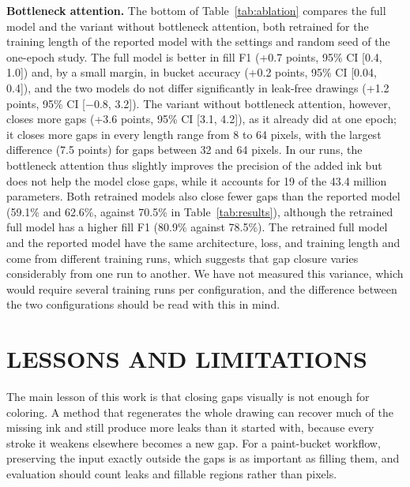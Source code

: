 \documentclass{IEEEcsmag}
\begin{document}
\textbf{Bottleneck attention.} The bottom of Table~\ref{tab:ablation} compares the
full model and the variant without bottleneck attention, both retrained for the
training length of the reported model with the settings and random seed of the
one-epoch study. The full model is better in fill F1 (+0.7 points, 95\% CI [0.4,
1.0]) and, by a small margin, in bucket accuracy (+0.2 points, 95\% CI [0.04, 0.4]),
and the two models do not differ significantly in leak-free drawings (+1.2 points,
95\% CI [$-0.8$, 3.2]). The variant without bottleneck attention, however, closes
more gaps (+3.6 points, 95\% CI [3.1, 4.2]), as it already did at one epoch; it
closes more gaps in every length range from 8 to 64 pixels, with the largest
difference (7.5 points) for gaps between 32 and 64 pixels. In our runs, the
bottleneck attention thus slightly improves the precision of the added ink but does
not help the model close gaps, while it accounts for 19 of the 43.4 million
parameters. Both retrained models also close fewer gaps than the reported model
(59.1\% and 62.6\%, against 70.5\% in Table~\ref{tab:results}), although the
retrained full model has a higher fill F1 (80.9\% against 78.5\%). The retrained full
model and the reported model have the same architecture, loss, and training length
and come from different training runs, which suggests that gap closure varies
considerably from one run to another. We have not measured this variance, which
would require several training runs per configuration, and the difference between
the two configurations should be read with this in mind.

\section{LESSONS AND LIMITATIONS}

The main lesson of this work is that closing gaps visually is not enough for
coloring. A method that regenerates the whole drawing can recover much of the
missing ink and still produce more leaks than it started with, because every stroke
it weakens elsewhere becomes a new gap. For a paint-bucket workflow, preserving the
input exactly outside the gaps is as important as filling them, and evaluation should
count leaks and fillable regions rather than pixels.
\end{document}
